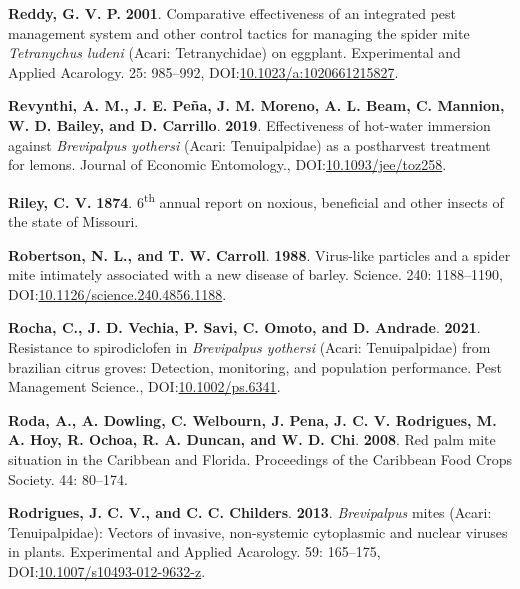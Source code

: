 \documentclass[12pt,final,CPage]{ufthesis}
\newlength{\cslhangindent}
\newenvironment{CSLReferences}[2] %
{%
	\setlength{\parindent}{0pt}
	\ifodd #1 \everypar{\setlength{\hangindent}{\cslhangindent}}\ignorespaces\fi
	\ifnum #2 > 0
	\setlength{\parskip}{#2\baselineskip}
	\fi
}%
{}
\begin{document}
{\begin{CSLReferences}{1}{0}
  \leavevmode{}%
  \textbf{Reddy, G. V. P.} \textbf{2001}. Comparative effectiveness of an integrated pest management system and other control tactics for managing the spider mite {\emph{Tetranychus ludeni}} {(Acari: Tetranychidae)} on eggplant. Experimental and Applied Acarology. 25: 985--992, DOI:\href{https://doi.org/10.1023/a:1020661215827}{10.1023/a:1020661215827}.

  \leavevmode{}%
  \textbf{Revynthi, A. M., J. E. Peña, J. M. Moreno, A. L. Beam, C. Mannion, W. D. Bailey, and D. Carrillo}. \textbf{2019}. Effectiveness of hot-water immersion against {\emph{Brevipalpus yothersi}} ({Acari}: {Tenuipalpidae}) as a postharvest treatment for lemons. Journal of Economic Entomology., DOI:\href{https://doi.org/10.1093/jee/toz258}{10.1093/jee/toz258}.

  \leavevmode{}%
  \textbf{Riley, C. V.} \textbf{1874}. 6\textsuperscript{th} annual report on noxious, beneficial and other insects of the state of {Missouri}.

  \leavevmode{}%
  \textbf{Robertson, N. L., and T. W. Carroll}. \textbf{1988}. Virus-like particles and a spider mite intimately associated with a new disease of barley. Science. 240: 1188--1190, DOI:\href{https://doi.org/10.1126/science.240.4856.1188}{10.1126/science.240.4856.1188}.

  \leavevmode{}%
  \textbf{Rocha, C., J. D. Vechia, P. Savi, C. Omoto, and D. Andrade}. \textbf{2021}. Resistance to spirodiclofen in {\emph{Brevipalpus yothersi}} ({Acari}: {Tenuipalpidae}) from brazilian citrus groves: Detection, monitoring, and population performance. Pest Management Science., DOI:\href{https://doi.org/10.1002/ps.6341}{10.1002/ps.6341}.

  \leavevmode{}%
  \textbf{Roda, A., A. Dowling, C. Welbourn, J. Pena, J. C. V. Rodrigues, M. A. Hoy, R. Ochoa, R. A. Duncan, and W. D. Chi}. \textbf{2008}. Red palm mite situation in the {Caribbean} and {Florida}. Proceedings of the Caribbean Food Crops Society. 44: 80--174.

  \leavevmode{}%
  \textbf{Rodrigues, J. C. V., and C. C. Childers}. \textbf{2013}. {\emph{Brevipalpus}} mites ({Acari}: {Tenuipalpidae}): Vectors of invasive, non-systemic cytoplasmic and nuclear viruses in plants. Experimental and Applied Acarology. 59: 165--175, DOI:\href{https://doi.org/10.1007/s10493-012-9632-z}{10.1007/s10493-012-9632-z}.


\end{CSLReferences}}
\end{document}
